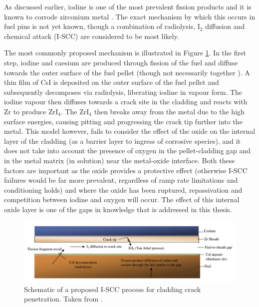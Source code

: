 As discussed earlier, iodine is one of the most prevalent fission products and it is known to corrode zirconium metal \cite{iodinezrmetal, Sidky1998, rosenbaum1966interaction, Fregonese1998, Lewis2011, anghel2010experimental}. The exact mechanism by which this occurs in fuel pins is not yet known, though a combination of radiolysis, I$_{2}$ diffusion and chemical attack (I-SCC) are considered to be most likely. 

The most commonly proposed mechanism is illustrated in Figure \ref{figure:vanarkel}. In the first step, iodine and caesium are produced through fission of the fuel and diffuse towards the outer surface of the fuel pellet (though not necessarily together \cite{Grimes1992}). A thin film of CsI is deposited on the outer surface of the fuel pellet and subsequently decomposes via radiolysis, liberating iodine in vapour form. The iodine vapour then diffuses towards a crack site in the cladding and reacts with Zr to produce ZrI$_{4}$. The ZrI$_{4}$ then breaks away from the metal due to the high surface energies, causing pitting and progressing the crack tip further into the metal. This model however, fails to consider the effect of the oxide on the internal layer of the cladding (as a barrier layer to ingress of corrosive species), and it does not take into account the presence of oxygen in the pellet-cladding gap and in the metal matrix (in solution) near the metal-oxide interface. Both these factors are important as the oxide provides a protective effect (otherwise I-SCC failures would be far more prevalent, regardless of ramp rate limitations and conditioning holds) and where the oxide has been ruptured, repassivation and competition between iodine and oxygen will occur. The effect of this internal oxide layer is one of the gaps in knowledge that is addressed in this thesis.

\begin{figure}[ht] %
\centering
\includegraphics[width=\linewidth]{images/vanarkel.png}
\caption[Schematic of a proposed I-SCC process for cladding crack penetration.]{Schematic of a proposed I-SCC process for cladding crack penetration. Taken from \cite{Lewis2011}.}
\label{figure:vanarkel}
\end{figure}

